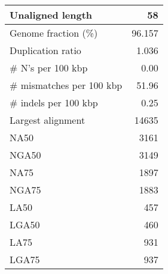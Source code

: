 \documentclass[12pt,a4paper]{article}
\begin{document}
\begin{table}[ht]
\begin{center}
\begin{tabular}{|l*{1}{|r}|}
Unaligned length & 58 \\ \hline
Genome fraction (\%) & 96.157 \\ \hline
Duplication ratio & 1.036 \\ \hline
\# N's per 100 kbp & 0.00 \\ \hline
\# mismatches per 100 kbp & 51.96 \\ \hline
\# indels per 100 kbp & 0.25 \\ \hline
Largest alignment & 14635 \\ \hline
NA50 & 3161 \\ \hline
NGA50 & 3149 \\ \hline
NA75 & 1897 \\ \hline
NGA75 & 1883 \\ \hline
LA50 & 457 \\ \hline
LGA50 & 460 \\ \hline
LA75 & 931 \\ \hline
LGA75 & 937 \\ \hline
\end{tabular}
\end{center}
\end{table}
\end{document}
